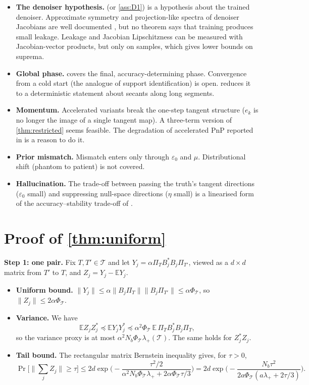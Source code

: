 \documentclass[11pt]{article}
\theoremstyle{definition}
\theoremstyle{remark}
\newcommand{\EE}{\mathbb E}
\newcommand{\norm}[1]{\lVert #1\rVert}
\newcommand{\T}{\mathcal T}
\begin{document}
\begin{itemize}
\item \textbf{The denoiser hypothesis.}  (or \cref{ass:D1}) is a hypothesis about the trained
  denoiser. Approximate symmetry and projection-like spectra of denoiser Jacobians are well documented
  \cite{mohan2020,kadkhodaie2024,manor2024}, but no theorem says that training produces small leakage. Leakage
  and Jacobian Lipschitzness can be measured with Jacobian-vector products, but only on samples, which gives
  lower bounds on suprema.
\item \textbf{Global phase.}  covers the final, accuracy-determining phase. Convergence from a cold
  start (the analogue of support identification) is open.  reduces it to a deterministic
  statement about secants along long segments.
\item \textbf{Momentum.} Accelerated variants break the one-step tangent structure ($e_k$ is no longer the image
  of a single tangent map). A three-term version of \cref{thm:restricted} seems feasible. The degradation of
  accelerated PnP reported in \cite{hong2024p2np} is a reason to do it.
\item \textbf{Prior mismatch.} Mismatch enters only through $\varepsilon_0$ and $\mu$. Distributional shift
  (phantom to patient) is not covered.
\item \textbf{Hallucination.} The trade-off between passing the truth's tangent directions ($\varepsilon_0$ small)
  and suppressing null-space directions ($\eta$ small) is a linearised form of the accuracy--stability
  trade-off of \cite{gottschling2025}.
\end{itemize}

\appendix
\section{Proof of \texorpdfstring{\cref{thm:uniform}}{Theorem 5.3}}\label{app:uniform}

\textbf{Step 1: one pair.} Fix $T,T'\in\T$ and let $Y_j=\alpha\Pi_TB_j^*B_j\Pi_{T'}$, viewed as a $d\times d$ matrix
from $T'$ to $T$, and $Z_j=Y_j-\EE Y_j$.
\begin{itemize}
\item \textbf{Uniform bound.} $\norm{Y_j}\leq\alpha\norm{B_j\Pi_T}\norm{B_j\Pi_{T'}}\leq\alpha\Phi_\T$, so
  $\norm{Z_j}\leq2\alpha\Phi_\T$.
\item \textbf{Variance.} We have
  \[
  \EE Z_jZ_j^*\preceq\EE Y_jY_j^*\preceq\alpha^2\Phi_\T\,\EE\,\Pi_TB_j^*B_j\Pi_T,
  \]
  so the variance proxy is at most $\alpha^2N_b\Phi_\T\lambda_+(\T)$. The same holds for $Z_j^*Z_j$.
\item \textbf{Tail bound.} The rectangular matrix Bernstein inequality \cite[Thm.~1.6]{tropp2012} gives, for
  $\tau>0$,
  \[
  \Pr\Big[\big\|\textstyle\sum_jZ_j\big\|\geq\tau\Big]\leq2d\exp\Big(-\frac{\tau^2/2}{\alpha^2N_b\Phi_\T\lambda_++2\alpha\Phi_\T\tau/3}\Big)
  =2d\exp\Big(-\frac{N_b\tau^2}{2a\Phi_\T(a\lambda_++2\tau/3)}\Big).
  \]
\end{itemize}
\end{document}
